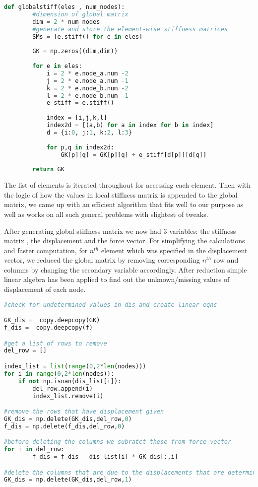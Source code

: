 \begin{lstlisting}[language=Python , basicstyle=\linespread{0.75}\listingsfont]
	def globalstiff(eles , num_nodes):
		#dimension of global matrix
		dim = 2 * num_nodes
		#generate and store the element-wise stiffness matrices
		SMs = [e.stiff() for e in eles]
	
		GK = np.zeros((dim,dim))
		
		for e in eles:
			i = 2 * e.node_a.num -2
			j = 2 * e.node_a.num -1
			k = 2 * e.node_b.num -2
			l = 2 * e.node_b.num -1
			e_stiff = e.stiff()
	
			index = [i,j,k,l]
			index2d = [(a,b) for a in index for b in index]
			d = {i:0, j:1, k:2, l:3}
			
			for p,q in index2d:
			    GK[p][q] = GK[p][q] + e_stiff[d[p]][d[q]]
		
		return GK
\end{lstlisting}

The list of elements is iterated throughout for accessing each element. Then with the logic of how the values in local stiffness matrix is appended to the global matrix, we came up with an efficient algorithm that fits well to our purpose as well as works on all such general problems with slightest of tweaks.

After generating global stiffness matrix we now had 3 variables: the stiffness matrix , the displacement and the force vector. For simplifying the calculations and faster computation, for $n^{th}$ element which was specified in the displacement vector, we reduced the global matrix by removing corresponding $n^{th}$ row and columns by changing the secondary variable accordingly.  After reduction simple linear algebra has been applied to find out the unknown/missing values of displacement of each node. 

\begin{lstlisting}[language=Python , basicstyle=\linespread{0.75}\listingsfont]
#check for undetermined values in dis and create linear eqns

GK_dis =  copy.deepcopy(GK)
f_dis =  copy.deepcopy(f)

#get a list of rows to remove
del_row = []

index_list = list(range(0,2*len(nodes)))
for i in range(0,2*len(nodes)):
    if not np.isnan(dis_list[i]):
        del_row.append(i)
        index_list.remove(i)

#remove the rows that have displacement given
GK_dis = np.delete(GK_dis,del_row,0)
f_dis = np.delete(f_dis,del_row,0)

#before deleting the columns we subratct these from force vector
for i in del_row:
        f_dis = f_dis - dis_list[i] * GK_dis[:,i]

#delete the columns that are due to the displacements that are determined
GK_dis = np.delete(GK_dis,del_row,1)
\end{lstlisting}


